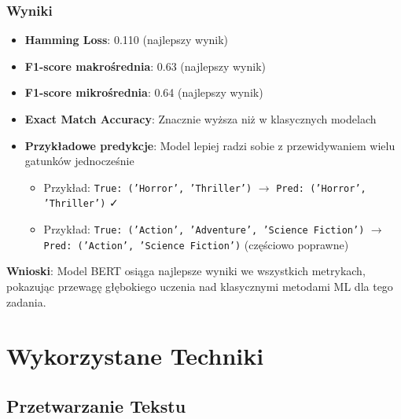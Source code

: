 \documentclass[12pt,a4paper]{article}
\begin{document}
\subsubsection{Wyniki}
\begin{itemize}
    \item \textbf{Hamming Loss}: 0.110 (najlepszy wynik)
    \item \textbf{F1-score makrośrednia}: 0.63 (najlepszy wynik)
    \item \textbf{F1-score mikrośrednia}: 0.64 (najlepszy wynik)
    \item \textbf{Exact Match Accuracy}: Znacznie wyższa niż w klasycznych modelach
    \item \textbf{Przykładowe predykcje}: Model lepiej radzi sobie z przewidywaniem wielu gatunków jednocześnie
    \begin{itemize}
        \item Przykład: \texttt{True: ('Horror', 'Thriller')} $\rightarrow$ \texttt{Pred: ('Horror', 'Thriller')} ✓
        \item Przykład: \texttt{True: ('Action', 'Adventure', 'Science Fiction')} $\rightarrow$ \texttt{Pred: ('Action', 'Science Fiction')} (częściowo poprawne)
    \end{itemize}
\end{itemize}

\textbf{Wnioski}: Model BERT osiąga najlepsze wyniki we wszystkich metrykach, pokazując przewagę głębokiego uczenia nad klasycznymi metodami ML dla tego zadania.

\section{Wykorzystane Techniki}

\subsection{Przetwarzanie Tekstu}
\end{document}

